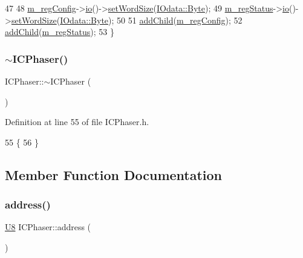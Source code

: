 \begin{DoxyCode}
47 
48     \hyperlink{classICPhaser_af135fe05b7c087639789afe470e88ce4}{m\_regConfig}->\hyperlink{classIOobject_af04fb94137c3d86849f478ac5afab5d1}{io}()->\hyperlink{classIOdata_a20f30a9f4673713616447b1b5e9817d5}{setWordSize}(\hyperlink{classIOdata_a37c53ebf4bf8d866aac8af572962a84ca00156611f08eeb1b5d361de809dafb8e}{IOdata::Byte});
49     \hyperlink{classICPhaser_adcc37517abf1390407003c387008262d}{m\_regStatus}->\hyperlink{classIOobject_af04fb94137c3d86849f478ac5afab5d1}{io}()->\hyperlink{classIOdata_a20f30a9f4673713616447b1b5e9817d5}{setWordSize}(\hyperlink{classIOdata_a37c53ebf4bf8d866aac8af572962a84ca00156611f08eeb1b5d361de809dafb8e}{IOdata::Byte});
50 
51     \hyperlink{classHierarchy_ad677774ff38fcb257c04a3a10d471fac}{addChild}(\hyperlink{classICPhaser_af135fe05b7c087639789afe470e88ce4}{m\_regConfig});
52     \hyperlink{classHierarchy_ad677774ff38fcb257c04a3a10d471fac}{addChild}(\hyperlink{classICPhaser_adcc37517abf1390407003c387008262d}{m\_regStatus});
53   \}
\end{DoxyCode}
\mbox{\label{classICPhaser_a70e439f0c27e1171fef80b774ca83ab6}} 
\subsubsection{\texorpdfstring{$\sim$\+I\+C\+Phaser()}{~ICPhaser()}}
{\footnotesize\ttfamily I\+C\+Phaser\+::$\sim$\+I\+C\+Phaser (\begin{DoxyParamCaption}{ }\end{DoxyParamCaption})\hspace{0.3cm}{\ttfamily [inline]}}



Definition at line 55 of file I\+C\+Phaser.\+h.


\begin{DoxyCode}
55              \{
56   \}
\end{DoxyCode}


\subsection{Member Function Documentation}
\mbox{\label{classICPhaser_ac5cd0f3cb56324782ae8d360944a94fd}} 
\subsubsection{\texorpdfstring{address()}{address()}}
{\footnotesize\ttfamily \hyperlink{classICPhaser_a4f9b2302efbd7bdd70d7d80b415f1a9d}{U8} I\+C\+Phaser\+::address (\begin{DoxyParamCaption}{ }\end{DoxyParamCaption})\hspace{0.3cm}{\ttfamily [inline]}}



